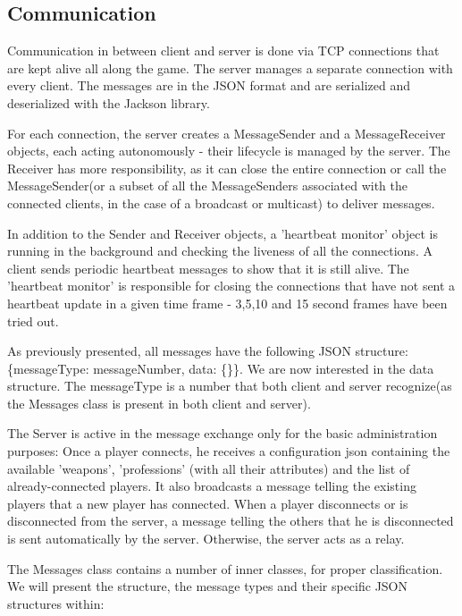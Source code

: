 \subsection{Communication}

Communication in between client and server is done via TCP connections that are
kept alive all along the game. The server manages a separate connection with
every client. The messages are in the JSON format and are serialized and
deserialized with the Jackson library.\newline

For each connection, the server creates a MessageSender and a MessageReceiver
objects, each acting autonomously - their lifecycle is managed by the server.
The Receiver has more responsibility, as it can close the entire connection
or call the MessageSender(or a subset of all the MessageSenders associated with
the connected clients, in the case of a broadcast or multicast) to deliver
messages.\newline

In addition to the Sender and Receiver objects, a 'heartbeat monitor' object is
running in the background and checking the liveness of all the connections. A
client sends periodic heartbeat messages to show that it is still alive. The
'heartbeat monitor' is responsible for closing the connections that have not
sent a heartbeat update in a given time frame - 3,5,10 and 15 second frames have
been tried out.\newline

As previously presented, all messages have the following JSON structure:
\{messageType: messageNumber, data: \{\}\}. We are now interested in the data
structure. The messageType is a number that both client and server recognize(as
the Messages class is present in both client and server).\newline

The Server is active in the message exchange only for the basic administration
purposes: Once a player connects, he receives a configuration json containing
the available 'weapons', 'professions' (with all their attributes) and the list
of already-connected players. It also broadcasts a message telling the existing
players that a new player has connected. When a player disconnects or is
disconnected from the server, a message telling the others that he is
disconnected is sent automatically by the server. Otherwise, the server acts as
a relay.\newline

The Messages class contains a number of inner classes, for proper
classification. We will present the structure, the message types and their
specific JSON structures within:

